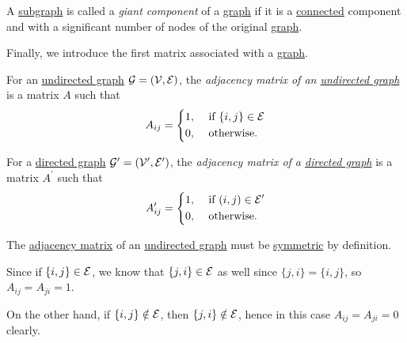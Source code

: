 \begin{definition}\label{def:giant-component}
	A \hyperref[def:subgraph]{subgraph} is called a \emph{giant component} of a \hyperref[def:graph]{graph} if it is a \hyperref[def:connected]{connected} component and with a
	significant number of nodes of the original \hyperref[def:graph]{graph}.
\end{definition}

Finally, we introduce the first matrix associated with a \hyperref[def:graph]{graph}.
\begin{definition}\label{def:adjacency-matrix}
	For an \hyperref[def:undirected-graph]{undirected graph} \(\mathcal{\MakeUppercase{g}} = (\mathcal{\MakeUppercase{v}} , \mathcal{\MakeUppercase{e}} )\),
	the \emph{adjacency matrix of an \hyperref[def:undirected-graph]{undirected graph}} is a matrix \(A\) such that
	\[
		A_{ij} =\begin{dcases}
			1, & \text{ if }\{i, j\}\in\mathcal{E} \\
			0, & \text{ otherwise.}
		\end{dcases}
	\]

	For a \hyperref[def:directed-graph]{directed graph} \(\mathcal{\MakeUppercase{g}}^\prime = (\mathcal{\MakeUppercase{v}}^\prime , \mathcal{\MakeUppercase{e}}^\prime )\),
	the \emph{adjacency matrix of a \hyperref[def:directed-graph]{directed graph}} is a matrix \(A^\prime\) such that
	\[
		A^\prime _{ij} = \begin{dcases}
			1, & \text{ if }(i, j)\in\mathcal{E}^\prime \\
			0, & \text{ otherwise.}
		\end{dcases}
	\]
\end{definition}

\begin{remark}
	The \hyperref[def:adjacency-matrix]{adjacency matrix} of an \hyperref[def:undirected-graph]{undirected graph} must be \hyperref[def:symmetric-matrix]{symmetric} by definition.
\end{remark}
\begin{explanation}
	Since if \(\{i, j\}\in \mathcal{\MakeUppercase{e}} \), we know that \(\{j, i\}\in \mathcal{\MakeUppercase{e}} \) as well since \(\{j, i\} = \{i, j\}\), so
	\(A_{ij} = A_{ji} = 1\).

	On the other hand, if \(\{i, j\}\notin \mathcal{\MakeUppercase{e}} \), then \(\{j, i\}\notin \mathcal{\MakeUppercase{e}} \), hence in this case
	\(A_{ij} = A_{ji} = 0\) clearly.
\end{explanation}